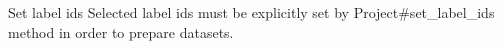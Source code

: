 Set label ids Selected label ids must be explicitly set by {\ttfamily Project\#set\+\_\+label\+\_\+ids} method in order to prepare datasets.